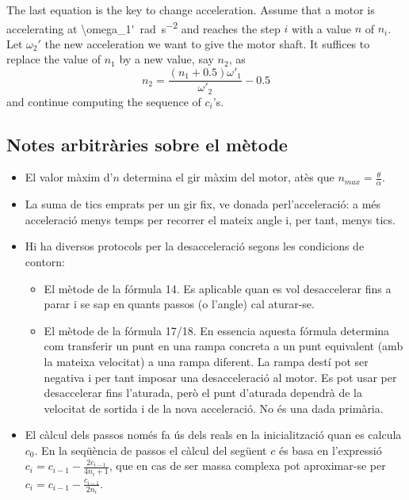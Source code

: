 \documentclass[a4paper]{article}
\newcommand{\vSI}[2]{\SI[math-rm=\ensuremath,parse-numbers=false]{#1}{#2}}
\begin{document}
The last equation is the key to change acceleration. Assume that a
motor is accelerating at \vSI{\omega_1'}{\radian\per\second\squared}
and reaches the step $i$ with a value $n$ of $n_i$. Let $\omega_2'$
the new acceleration we want to give the motor shaft. It suffices to
replace the value of $n_1$ by a new value, say $n_2$, as
\begin{equation*}
  n_2 = \frac{(n_1+0.5)\omega'_1}{\omega'_2} - 0.5 
\end{equation*}
and continue computing the sequence of $c_i$'s.



\subsection{Notes arbitràries sobre el mètode}

\begin{itemize}
\item El valor màxim d'$n$ determina el gir màxim del motor, atès que
  $n_{max} = \frac\theta\alpha$.
\item La suma de tics emprats per un gir fix, ve donada
  perl'acceleració: a més acceleració menys temps per recorrer el
  mateix angle i, per tant, menys tics.
\item Hi ha diversos protocols per la desacceleració segons les
  condicions de contorn:
  \begin{itemize}
  \item El mètode de la fórmula 14. Es aplicable quan es vol
    desaccelerar fins a parar i se sap en quants passos (o l'angle)
    cal aturar-se.
  \item El mètode de la fórmula 17/18. En essencia aquesta fórmula
    determina com transferir un punt en una rampa concreta a un punt
    equivalent (amb la mateixa velocitat) a una rampa diferent. La
    rampa destí pot ser negativa i per tant imposar una desacceleració
    al motor.  Es pot usar per desaccelerar fins l'aturada, però el
    punt d'aturada dependrà de la velocitat de sortida i de la nova
    acceleració. No és una dada primària.
  \end{itemize}
\item El càlcul dels passos només fa ús dels reals en la
  inicialització quan es calcula $c_0$. En la seqüència de passos el
  càlcul del següent $c$ és basa en l'expressió
  $c_i = c_{i-1} - \frac{2c_{i-1}}{4n_i + 1}$, que en cas de ser massa
  complexa pot aproximar-se per
  $c_i = c_{i-1} - \frac{c_{i-1}}{2n_i}$.
\end{itemize}



\printbibliography
\end{document}
